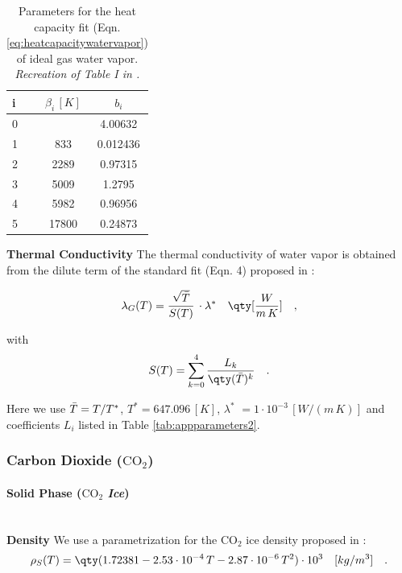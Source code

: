 \begin{table}[]
\centering
\begin{tabular}{l|l S[table-format=5.0] S[table-format=1.6]}
\textbf{i} & \quad & {$\beta_i\,[K]$} & {$b_i$}    \\
 & &                & 4.00632  \\
1 & & 833            & 0.012436 \\
2 & & 2289           & 0.97315  \\
3 & & 5009           & 1.2795   \\
4 & & 5982           & 0.96956  \\
5 & & 17800          & 0.24873 
\end{tabular}
\caption[Fitting Parameters: Heat Capacity of Ideal Gas Water Vapor]{Parameters for the heat capacity fit (Eqn. \ref{eq:heatcapacitywatervapor}) of ideal gas water vapor. \textit{Recreation of Table I in \cite{cooper1982representation}.}}
\label{tab:appcpfitparams}
\end{table}

\textbf{Thermal Conductivity}
The thermal conductivity of water vapor is obtained from the dilute term of the standard fit (Eqn. 4) proposed in \cite{huber2012new}:

\begin{equation}\label{eq:thermalconductivitywatervapor}
    \lambda_{G}(T) = \frac{\sqrt{\Bar{T}}}{S(T)}\,\cdot \lambda^* \quad \qty[\frac{W}{m\,K}] \quad ,
\end{equation}

with 
\begin{equation}
    S(T) = \sum_{k=0}^4 \frac{L_k}{\qty(\Bar{T})^k} \quad .
\end{equation}

Here we use $\Bar{T}=T/T^*$, $T^* = 647.096\,[K]$, $\lambda^*$ $=1\cdot 10^{-3}\,[W / (m\,K)]$ and coefficients $L_i$ listed in Table \ref{tab:appparameters2}.

\subsubsection{Carbon Dioxide ($\text{CO}_2$)}

\paragraph{Solid Phase ($\text{CO}_2$ \textit{Ice})}\mbox{}\\

\textbf{Density}
We use a parametrization for the $\text{CO}_2$ ice density proposed in \cite{mangan2017co2}:
\begin{equation}\label{eq:densityco2ice}
    \rho_S(T) =  \qty(1.72381 -2.53\cdot10^{-4}\,T - 2.87\cdot10^{-6}\,T^2)\cdot 10^3 \quad [kg / m^3] \quad .
\end{equation}

